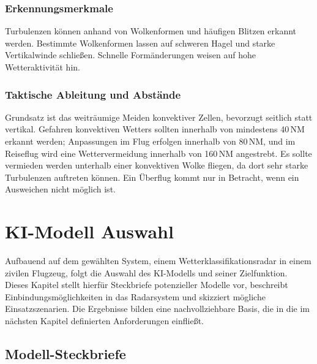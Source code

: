 \subsection*{Erkennungsmerkmale}
Turbulenzen können anhand von Wolkenformen und häufigen Blitzen erkannt werden. Bestimmte 
Wolkenformen lassen auf schweren Hagel und starke Vertikalwinde schließen. Schnelle 
Formänderungen weisen auf hohe Wetteraktivität hin.

\subsection*{Taktische Ableitung und Abstände}
Grundsatz ist das weiträumige Meiden konvektiver Zellen, bevorzugt seitlich statt vertikal. 
Gefahren konvektiven Wetters sollten innerhalb von mindestens 40\,NM erkannt werden; Anpassungen 
im Flug erfolgen innerhalb von 80\,NM, und im Reiseflug wird eine Wettervermeidung innerhalb 
von 160\,NM angestrebt. Es sollte vermieden werden unterhalb einer konvektiven Wolke fliegen, da dort sehr starke 
Turbulenzen auftreten können. Ein Überflug kommt nur in Betracht, wenn ein Ausweichen nicht möglich ist.










\chapter{KI-Modell Auswahl}\label{chap:modelle}

Aufbauend auf dem gewählten System, einem Wetterklassifikationsradar in einem zivilen Flugzeug, 
folgt die Auswahl des KI-Modells und seiner Zielfunktion. 
Dieses Kapitel stellt hierfür Steckbriefe potenzieller Modelle vor, beschreibt 
Einbindungsmöglichkeiten in das Radarsystem und skizziert mögliche Einsatzszenarien.
Die Ergebnisse bilden eine nachvollziehbare Basis, die in die im nächsten Kapitel 
definierten Anforderungen einfließt.

\section{Modell-Steckbriefe} \label{sec:modell_steckbrief}

